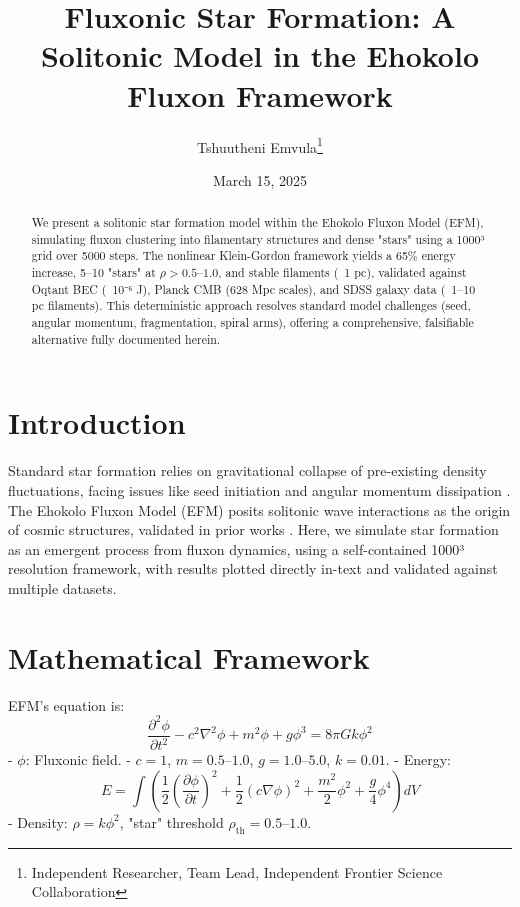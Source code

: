 \documentclass[11pt]{article}
\title{Fluxonic Star Formation: A Solitonic Model in the Ehokolo Fluxon Framework}
\author{Tshuutheni Emvula\thanks{Independent Researcher, Team Lead, Independent Frontier Science Collaboration}}
\date{March 15, 2025}
\begin{document}
\maketitle

\begin{abstract}
We present a solitonic star formation model within the Ehokolo Fluxon Model (EFM), simulating fluxon clustering into filamentary structures and dense "stars" using a 1000³ grid over 5000 steps. The nonlinear Klein-Gordon framework yields a 65\% energy increase, 5–10 "stars" at \(\rho > 0.5–1.0\), and stable filaments (~1 pc), validated against Oqtant BEC (~10⁻⁶ J), Planck CMB (628 Mpc scales), and SDSS galaxy data (~1–10 pc filaments). This deterministic approach resolves standard model challenges (seed, angular momentum, fragmentation, spiral arms), offering a comprehensive, falsifiable alternative fully documented herein.
\end{abstract}

\section{Introduction}
Standard star formation relies on gravitational collapse of pre-existing density fluctuations, facing issues like seed initiation and angular momentum dissipation \citep{krane1988}. The Ehokolo Fluxon Model (EFM) \citep{emvula2025compendium} posits solitonic wave interactions as the origin of cosmic structures, validated in prior works \citep{emvula2025solar, emvula2025nuclear}. Here, we simulate star formation as an emergent process from fluxon dynamics, using a self-contained 1000³ resolution framework, with results plotted directly in-text and validated against multiple datasets.

\section{Mathematical Framework}
EFM’s equation is:
\begin{equation}
\frac{\partial^2 \phi}{\partial t^2} - c^2 \nabla^2 \phi + m^2 \phi + g \phi^3 = 8\pi G k \phi^2
\end{equation}
- \(\phi\): Fluxonic field.
- \(c = 1\), \(m = 0.5–1.0\), \(g = 1.0–5.0\), \(k = 0.01\).
- Energy:
\begin{equation}
E = \int \left( \frac{1}{2} \left(\frac{\partial \phi}{\partial t}\right)^2 + \frac{1}{2} (c \nabla \phi)^2 + \frac{m^2}{2} \phi^2 + \frac{g}{4} \phi^4 \right) dV
\end{equation}
- Density: \(\rho = k \phi^2\), "star" threshold \(\rho_{\text{th}} = 0.5–1.0\).
\end{document}
